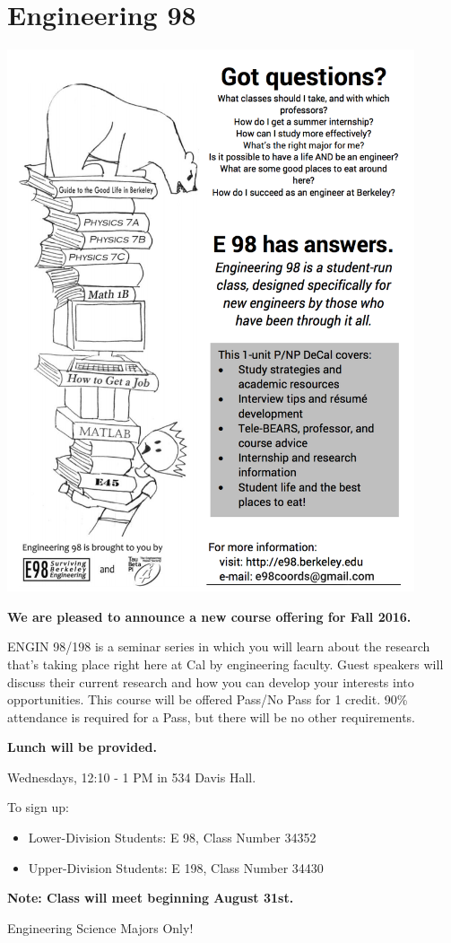 \chapter*{Engineering 98}

\begin{center}
    \includegraphics[width=0.9\textwidth]{resources/e98-flyer.png}
\end{center}

\newpage
\textbf{We are pleased to announce a new course offering for Fall 2016.}
 
ENGIN 98/198 is a seminar series in which you will learn about the research that's taking place right here at Cal by engineering faculty. Guest speakers will discuss their current research and how you can develop your interests into opportunities. This course will be offered Pass/No Pass for 1 credit. 90\% attendance is required for a Pass, but there will be no other requirements.
 
\textbf{Lunch will be provided.}
 
Wednesdays, 12:10 - 1 PM in 534 Davis Hall.
 
To sign up:

\begin{itemize}
  \item Lower-Division Students: E 98, Class Number 34352
  \item Upper-Division Students: E 198, Class Number 34430
\end{itemize}

\textbf{Note: Class will meet beginning August 31st.}
 
Engineering Science Majors Only!

